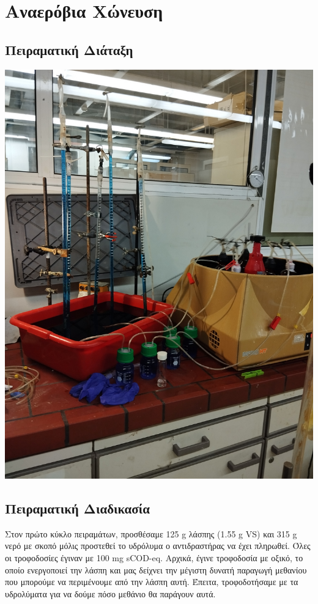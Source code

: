 \documentclass[11pt]{article}
\begin{document}
\section{Αναερόβια Χώνευση}
\label{sec:org1afe2f0}
\subsection{Πειραματική Διάταξη}
\label{sec:orgc966846}
\begin{center}
\includegraphics[width=.9\linewidth]{IMG_20240327_185818.jpg}
\end{center}

\subsection{Πειραματική Διαδικασία}
\label{sec:org75e3645}
Στον πρώτο κύκλο πειραμάτων, προσθέσαμε 125 g λάσπης (1.55 g VS) και 315 g νερό με σκοπό μόλις προστεθεί το υδρόλυμα ο αντιδραστήρας να έχει πληρωθεί. Όλες οι τροφοδοσίες έγιναν με 100 mg sCOD-eq. Αρχικά, έγινε τροφοδοσία με οξικό, το οποίο ενεργοποιεί την λάσπη και μας δείχνει την μέγιστη δυνατή παραγωγή μεθανίου που μπορούμε να περιμένουμε από την λάσπη αυτή. Έπειτα, τροφοδοτήσαμε με τα υδρολύματα για να δούμε πόσο μεθάνιο θα παράγουν αυτά.
\end{document}

